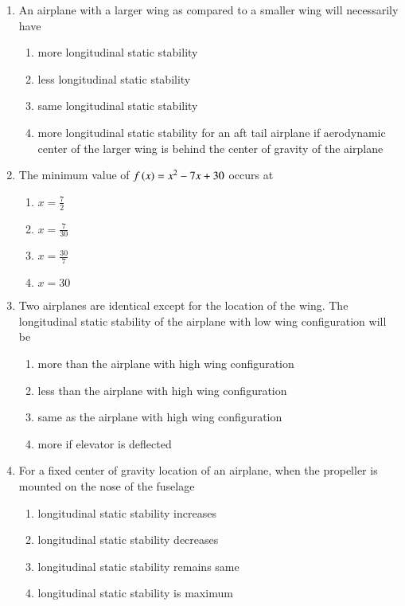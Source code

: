\documentclass[journal,12pt,twocolumn]{IEEEtran}
\theoremstyle{remark}
\begin{document}
\begin{enumerate}
\item An airplane with a larger wing as compared to a smaller wing will necessarily have
\begin{enumerate}
\item more longitudinal static stability
\item less longitudinal static stability
\item same longitudinal static stability
\item more longitudinal static stability for an aft tail airplane if aerodynamic center of the larger wing is behind the center of gravity of the airplane
\end{enumerate}


\item The minimum value of $f\left(x\right)=x^{2}-7x+30$ occurs at
\begin{multicols}{2}
\begin{enumerate}
\item $x=\frac{7}{2}$
\item $x=\frac{7}{30}$
\item $x=\frac{30}{7}$
\item $x=30$
\end{enumerate}
\end{multicols}


\item Two airplanes are identical except for the location of the wing. The longitudinal static stability of the airplane with low wing configuration will be
\begin{enumerate}
\item more than the airplane with high wing configuration
\item less than the airplane with high wing configuration
\item same as the airplane with high wing configuration
\item more if elevator is deflected
\end{enumerate}

\item For a fixed center of gravity location of an airplane, when the propeller is mounted on the nose of the fuselage
\begin{enumerate}
\item longitudinal static stability increases
\item longitudinal static stability decreases
\item longitudinal static stability remains same
\item longitudinal static stability is maximum
\end{enumerate}



\end{enumerate}
\end{document}
